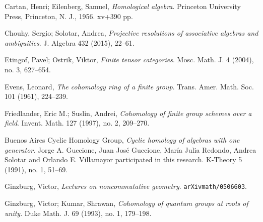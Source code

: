 \documentclass[a4paper,oneside,fleqn,11pt]{report}
\theoremstyle{definition}
\theoremstyle{definition}
\theoremstyle{definition}
\begin{document}
\begin{thebibliography}{999999}

 Cartan, Henri; Eilenberg, Samuel, \textit{Homological algebra}. Princeton University Press, Princeton, N. J., 1956. xv+390 pp.


 Chouhy, Sergio; Solotar, Andrea,
\textit{Projective resolutions of associative algebras and ambiguities}. 
J. Algebra 432 (2015), 22–61.


 Etingof, Pavel; Ostrik, Viktor, \textit{Finite tensor categories}. Mosc. Math. J. 4 (2004), no. 3, 627–654.


 Evens, Leonard,
\textit{The cohomology ring of a finite group}. 
Trans. Amer. Math. Soc. 101 (1961), 224–239.  


 Friedlander, Eric M.; Suslin, Andrei,
\textit{Cohomology of finite group schemes over a field}. 
Invent. Math. 127 (1997), no. 2, 209–270.

 Buenos Aires Cyclic Homology Group, \textit{Cyclic homology of algebras with one generator}. Jorge A. Guccione, Juan José Guccione, María Julia Redondo, Andrea Solotar and Orlando E. Villamayor participated in this research. K-Theory 5 (1991), no. 1, 51–69.

 Ginzburg, Victor, \textit{Lectures on noncommutative geometry}. \texttt{arXivmath/0506603}.


 Ginzburg, Victor; Kumar, Shrawan,
\textit{Cohomology of quantum groups at roots of unity}. 
Duke Math. J. 69 (1993), no. 1, 179–198. 


\end{thebibliography}
\end{document}
